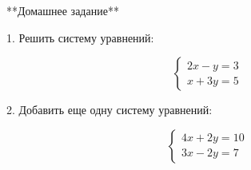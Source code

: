 \documentclass{article}
\begin{document}
**Домашнее задание**

1. Решить систему уравнений:

\[
\begin{cases}
2x - y = 3 \\
x + 3y = 5
\end{cases}
\]

2. Добавить еще одну систему уравнений:

\[
\begin{cases}
4x + 2y = 10 \\
3x - 2y = 7
\end{cases}
\]
\end{document}
